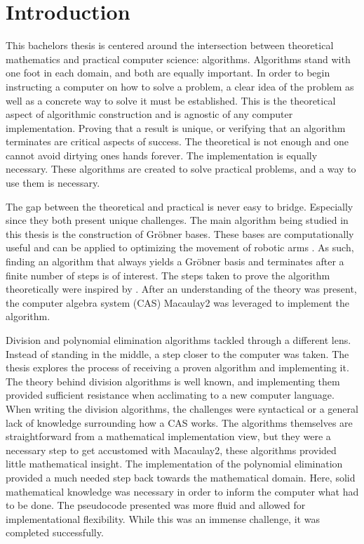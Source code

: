 \clearpage{\thispagestyle{empty}}
\section{Introduction}

This bachelors thesis is centered around the intersection between theoretical mathematics and practical computer science: algorithms. Algorithms stand with one foot in each domain, and both are equally important. In order to begin instructing a computer on how to solve a problem, a clear idea of the problem as well as a concrete way to solve it must be established. This is the theoretical aspect of algorithmic construction and is agnostic of any computer implementation. Proving that a result is unique, or verifying that an algorithm terminates are critical aspects of success. The theoretical is not enough and one cannot avoid dirtying ones hands forever. The implementation is equally necessary. These algorithms are created to solve practical problems, and a way to use them is necessary.

The gap between the theoretical and practical is never easy to bridge. Especially since they both present unique challenges. The main algorithm being studied in this thesis is the construction of Gröbner bases. These bases are computationally useful and can be applied to optimizing the movement of robotic arms \cite{Applied}. As such, finding an algorithm that always yields a Gröbner basis and terminates after a finite number of steps is of interest. The steps taken to prove the algorithm theoretically were inspired by \cite{Theory}. After an understanding of the theory was present, the computer algebra system (CAS) Macaulay2 \cite{M2} was leveraged to implement the algorithm.

Division and polynomial elimination algorithms tackled through a different lens. Instead of standing in the middle, a step closer to the computer was taken. The thesis explores the process of receiving a proven algorithm and implementing it. The theory behind division algorithms is well known, and implementing them provided sufficient resistance when acclimating to a new computer language. When writing the division algorithms, the challenges were syntactical or a general lack of knowledge surrounding how a CAS works. The algorithms themselves are straightforward from a mathematical implementation view, but they were a necessary step to get accustomed with Macaulay2, these algorithms provided little mathematical insight. The implementation of the polynomial elimination provided a much needed step back towards the mathematical domain. Here, solid mathematical knowledge was necessary in order to inform the computer what had to be done. The pseudocode presented was more fluid and allowed for implementational flexibility. While this was an immense challenge, it was completed successfully.